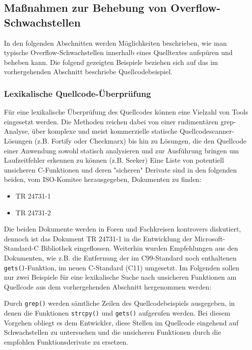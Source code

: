 \subsection{Maßnahmen zur Behebung von Overflow-Schwachstellen}

In den folgenden Abschnitten werden Möglichkeiten beschrieben, wie man 
typische Overflow-Schwachstellen innerhalb eines Quelltextes aufspüren 
und beheben kann. Die folgend gezeigten Beispiele beziehen sich auf das 
im vorhergehenden Abschnitt beschriebe Quellcodebeispiel.

\subsubsection{Lexikalische Quellcode-Überprüfung}

Für eine lexikalische Überprüfung des Quellcodes können eine Vielzahl 
von Tools eingesetzt werden. Die Methoden reichen dabei von einer 
rudimentären grep-Analyse, über komplexe und meist kommerzielle 
statische Quellcodescanner-Lösungen (z.B. Fortify oder Checkmarx) 
bis hin zu Lösungen, die den Quellcode einer Anwendung sowohl statisch 
analysieren und zur Ausführung bringen um Laufzeitfehler erkennen zu 
können (z.B. Seeker)
Eine Liste von potentiell unsicheren C-Funktionen und deren "sicheren" 
Derivate sind in den folgenden beiden, vom ISO-Komitee herausgegeben, 
Dokumenten zu finden:

\begin{itemize}
      \item TR 24731-1 \cite{iso_tr_24731_1} %
      \item TR 24731-2 \cite{iso_wdtr_24731_2} %
\end{itemize}
	
Die beiden Dokumente werden in Foren und Fachkreisen kontrovers 
diskutiert, dennoch ist das Dokument TR 24731-1 in die Entwicklung 
der Microsoft-Standard-C Bibliothek eingeflossen. Weiterhin wurden 
Empfehlungen aus den Dokumenten, wie z.B. die Entfernung der im 
C99-Standard noch enthaltenen \texttt{gets()}-Funktion, im neuen 
C-Standard (C11) umgesetzt.
Im Folgenden sollen nur zwei Beispiele für eine lexikalische Suche 
nach unsicheren Funktionen am Quellcode aus dem vorhergehenden 
Abschnitt hergenommen werden:
\par\medskip 
Durch \texttt{grep()} werden sämtliche Zeilen des Quellcodebeispiels 
ausgegeben, in denen die Funktionen \texttt{strcpy()} und \texttt{gets()} 
aufgerufen werden. Bei diesem Vorgehen obliegt es dem Entwickler, diese 
Stellen im Quellcode eingehend auf Schwachstellen zu untersuchen und 
die unsicheren Funktionen durch die empfohlen Funktionsderivate zu 
ersetzen.

